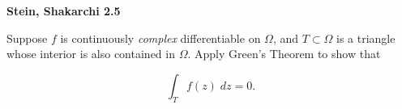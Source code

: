 \textbf{Stein, Shakarchi 2.5}

Suppose $f$ is continuously \textit{complex} differentiable on $\Omega$, and $T \subset \Omega$ is a triangle whose 
interior is also contained in $\Omega$. Apply Green's Theorem to show that

$$
\int_T f(z) \; dz = 0.
$$

\begin{solution}
    \ \\
\end{solution}